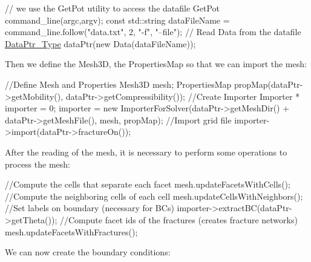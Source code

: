 \begin{DoxyCode}
\textcolor{comment}{// we use the GetPot utility to access the datafile}
GetPot command\_line(argc,argv);
\textcolor{keyword}{const} std::string dataFileName = command\_line.follow(\textcolor{stringliteral}{"data.txt"}, 2, \textcolor{stringliteral}{"-f"}, \textcolor{stringliteral}{"--file"});
\textcolor{comment}{// Read Data from the datafile}
\hyperlink{namespaceFVCode3D_a3d19a370a98afe491a9e17a646a9c56f}{DataPtr\_Type} dataPtr(\textcolor{keyword}{new} Data(dataFileName));
\end{DoxyCode}


Then we define the Mesh3D, the Properties\+Map so that we can import the mesh\+:


\begin{DoxyCode}
\textcolor{comment}{//Define Mesh and Properties}
Mesh3D mesh;
PropertiesMap propMap(dataPtr->getMobility(), dataPtr->getCompressibility());
\textcolor{comment}{//Create Importer}
Importer * importer = 0;
importer = \textcolor{keyword}{new} ImporterForSolver(dataPtr->getMeshDir() + dataPtr->getMeshFile(), mesh, propMap);
\textcolor{comment}{//Import grid file}
importer->import(dataPtr->fractureOn());
\end{DoxyCode}


After the reading of the mesh, it is necessary to perform some operations to process the mesh\+:


\begin{DoxyCode}
\textcolor{comment}{//Compute the cells that separate each facet}
mesh.updateFacetsWithCells();
\textcolor{comment}{//Compute the neighboring cells of each cell}
mesh.updateCellsWithNeighbors();
\textcolor{comment}{//Set labels on boundary (necessary for BCs)}
importer->extractBC(dataPtr->getTheta());
\textcolor{comment}{//Compute facet ids of the fractures (creates fracture networks)}
mesh.updateFacetsWithFractures();
\end{DoxyCode}


We can now create the boundary conditions\+:



